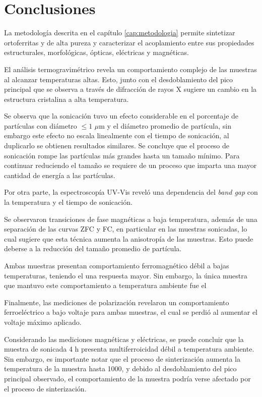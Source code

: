 \documentclass[../main.tex]{subfiles}
\begin{document}
\chapter{Conclusiones}
La metodología descrita en el capítulo \ref{cap:metodologia} permite sintetizar ortoferritas \neod{} y \sama{} de alta pureza y caracterizar el acoplamiento entre sus propiedades estructurales, morfológicas, ópticas, eléctricas y magnéticas.

El análisis termogravimétrico revela un comportamiento complejo de las muestras al alcanzar temperaturas altas. Esto, junto con el desdoblamiento del pico principal que se observa a través de difracción de rayos X sugiere un cambio en la estructura cristalina a alta temperatura.

Se observa que la sonicación tuvo un efecto considerable en el porcentaje de partículas con diámetro $\leq1$ $\mu$m y el diámetro promedio de partícula, sin embargo este efecto no escala linealmente con el tiempo de sonicación, al duplicarlo se obtienen resultados similares. Se concluye que el proceso de sonicación rompe las partículas más grandes hasta un tamaño mínimo. Para continuar reduciendo el tamaño se requiere de un proceso que imparta una mayor cantidad de energía a las partículas.

Por otra parte, la espectroscopía UV-Vis reveló una dependencia del \textit{band gap} con la temperatura y el tiempo de sonicación.

Se observaron transiciones de fase magnéticas a baja temperatura, además de una separación de las curvas ZFC y FC, en particular en las muestras sonicadas, lo cual sugiere que esta técnica aumenta la anisotropía de las muestras. Esto puede deberse a la reducción del tamaño promedio de partícula.

Ambas muestras presentan comportamiento ferromagnético débil a bajas temperaturas, teniendo el \sama{} una respuesta mayor. Sin embargo, la única muestra que mantuvo este comportamiento a temperatura ambiente fue el \sama{}

Finalmente, las mediciones de polarización revelaron un comportamiento ferroeléctrico a bajo voltaje para ambas muestras, el cual se perdió al aumentar el voltaje máximo aplicado.

Considerando las mediciones magnéticas y eléctricas, se puede concluir que la muestra de \sama{} sonicada 4 h presenta multiferroicidad débil a temperatura ambiente. Sin embargo, es importante notar que el proceso de sinterización aumenta la temperatura de la muestra hasta 1000\gradoC{}, y debido al desdoblamiento del pico principal observado, el comportamiento de la muestra podría verse afectado por el proceso de sinterización.
\end{document}

